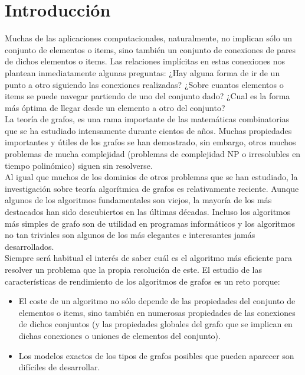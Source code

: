\chapter{Introducción}
\label{chap:introduccion}

Muchas de las aplicaciones computacionales, naturalmente, no implican sólo un conjunto de elementos o items, sino también un conjunto de conexiones de pares de dichos elementos o items. Las relaciones implícitas en estas conexiones nos plantean inmediatamente algunas preguntas: ¿Hay alguna forma de ir de un punto a otro siguiendo las conexiones realizadas? ¿Sobre cuantos elementos o items se puede navegar partiendo de uno del conjunto dado? ¿Cual es la forma más óptima de llegar desde un elemento a otro del conjunto?\\

La teoría de grafos, es una rama importante de las matemáticas combinatorias que se ha estudiado intensamente durante cientos de años. Muchas propiedades importantes y útiles de los grafos se han demostrado, sin embargo, otros muchos problemas de mucha complejidad (problemas de complejidad NP o irresolubles en tiempo polinómico) siguen sin resolverse.\\

Al igual que muchos de los dominios de otros problemas que se han estudiado, la investigación sobre teoría algorítmica de grafos es relativamente reciente. Aunque algunos de los algoritmos fundamentales son viejos, la mayoría de los más destacados han sido descubiertos en las últimas décadas. Incluso los algoritmos más simples de grafo son de utilidad en programas informáticos y los algoritmos no tan triviales son algunos de los más elegantes e interesantes jamás desarrollados.\\

Siempre será habitual el interés de saber cuál es el algoritmo más eficiente para resolver un problema que la propia resolución de este. El estudio de las características de rendimiento de los algoritmos de grafos es un reto porque:\\

\begin{itemize}
  
\item El coste de un algoritmo no sólo depende de las propiedades del conjunto de elementos o items, sino también en numerosas propiedades de las conexiones de dichos conjuntos (y las propiedades globales del grafo que se implican en dichas conexiones o uniones de elementos del conjunto).

\item Los modelos exactos de los tipos de grafos posibles que pueden aparecer son difíciles de desarrollar.

\end{itemize}

